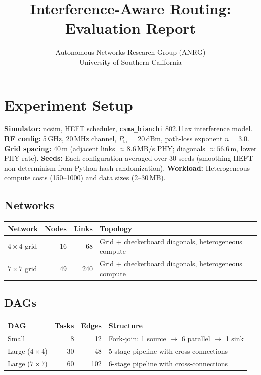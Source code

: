 \documentclass[11pt]{article}
\title{Interference-Aware Routing:\\Evaluation Report}
\author{Autonomous Networks Research Group (ANRG)\\University of Southern California}
\date{}
\begin{document}
\maketitle

\section{Experiment Setup}

\textbf{Simulator:} ncsim, HEFT scheduler, \texttt{csma\_bianchi} 802.11ax interference model.
\textbf{RF config:} 5\,GHz, 20\,MHz channel, $P_{\mathrm{tx}}=20$\,dBm, path-loss exponent $n=3.0$.
\textbf{Grid spacing:} 40\,m (adjacent links $\approx8.6$\,MB/s PHY; diagonals $\approx56.6$\,m, lower PHY rate).
\textbf{Seeds:} Each configuration averaged over 30 seeds (smoothing HEFT non-determinism from Python hash randomization).
\textbf{Workload:} Heterogeneous compute costs (150--1000) and data sizes (2--30\,MB).

\subsection{Networks}

\begin{table}[h]
\centering
\begin{tabular}{lrrp{6.5cm}}
\toprule
\textbf{Network} & \textbf{Nodes} & \textbf{Links} & \textbf{Topology} \\
\midrule
$4\times4$ grid & 16 & 68  & Grid + checkerboard diagonals, heterogeneous compute \\
$7\times7$ grid & 49 & 240 & Grid + checkerboard diagonals, heterogeneous compute \\
\bottomrule
\end{tabular}
\end{table}

\subsection{DAGs}

\begin{table}[h]
\centering
\begin{tabular}{lrrp{6cm}}
\toprule
\textbf{DAG} & \textbf{Tasks} & \textbf{Edges} & \textbf{Structure} \\
\midrule
Small           &  8 &  12 & Fork-join: 1 source $\to$ 6 parallel $\to$ 1 sink \\
Large ($4\times4$) & 30 &  48 & 5-stage pipeline with cross-connections \\
Large ($7\times7$) & 60 & 102 & 6-stage pipeline with cross-connections \\
\bottomrule
\end{tabular}
\end{table}
\end{document}
